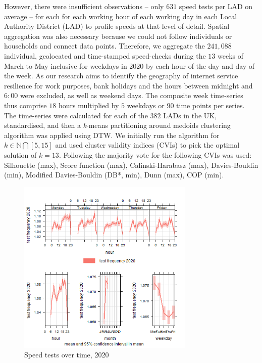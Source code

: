 \documentclass[Royal,times,sageh]{sagej}
\begin{document}
However, there were insufficient observations -- only \(631\) speed
tests per LAD on average -- for each for each working hour of each
working day in each Local Authority District (LAD) to profile speeds at
that level of detail. Spatial aggregation was also necessary because we
could not follow individuals or households and connect data points.
Therefore, we aggregate the \(241,088\) individual, geolocated and
time-stamped speed-checks during the \(13\) weeks of March to May
inclusive for weekdays in \(2020\) by each hour of the day and day of
the week. As our research aims to identify the geography of internet
service resilience for work purposes, bank holidays and the hours
between midnight and \(6:00\) were excluded, as well as weekend days.
The composite week time-series thus comprise \(18\) hours multiplied by
\(5\) weekdays or \(90\) time points per series. The time-series were
calculated for each of the \(382\) LADs in the UK, standardised, and
then a \emph{k}-means partitioning around medoids clustering algorithm
was applied using DTW. We initially run the algorithm for
\(k \in \mathbb{N} \bigcap [5,15]\) and used cluster validity indices
(CVIs) to pick the optimal solution of \(k = 13\). Following
\citet{sardatime} the majority vote for the following CVIs was used:
Silhouette (max), Score function (max), Calinski-Harabasz (max),
Davies-Bouldin (min), Modified Davies-Bouldin (DB*, min), Dunn (max),
COP (min).

\begin{figure}
\centering
\includegraphics[width=0.75\textwidth,height=0.4\textheight]{figures/time.var.plot2020.png}
\caption{Speed tests over time, 2020 \label{test2020}}
\end{figure}
\end{document}
